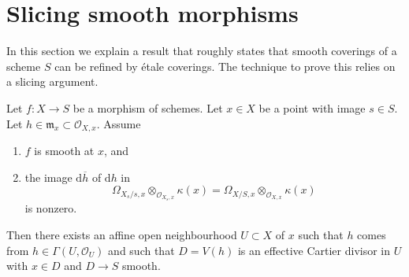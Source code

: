 \section{Slicing smooth morphisms}
\label{section-etale-over-smooth}

\noindent
In this section we explain a result that roughly states that
smooth coverings of a scheme $S$ can be refined by \'etale coverings.
The technique to prove this relies on a slicing argument.

\begin{lemma}
\label{lemma-slice-smooth-given-element}
Let $f : X \to S$ be a morphism of schemes.
Let $x \in X$ be a point with image $s \in S$.
Let $h \in \mathfrak m_x \subset \mathcal{O}_{X, x}$.
Assume
\begin{enumerate}
\item $f$ is smooth at $x$, and
\item the image $\text{d}\overline{h}$ of $\text{d}h$ in
$$
\Omega_{X_s/s, x} \otimes_{\mathcal{O}_{X_s, x}} \kappa(x) =
\Omega_{X/S, x} \otimes_{\mathcal{O}_{X, x}} \kappa(x)
$$
is nonzero.
\end{enumerate}
Then there exists an affine open neighbourhood $U \subset X$ of $x$
such that $h$ comes from $h \in \Gamma(U, \mathcal{O}_U)$ and such
that $D = V(h)$ is an effective Cartier divisor in $U$ with $x \in D$ and
$D \to S$ smooth.
\end{lemma}

